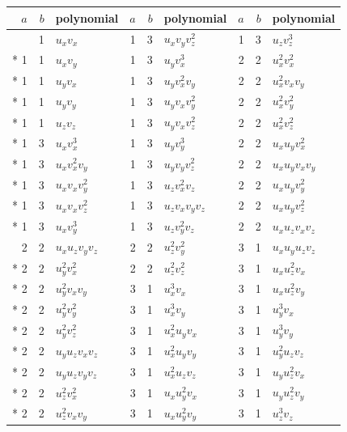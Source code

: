 \documentclass[10pt,a4paper]{article}
\makeatletter
\def\grouprule#1#2{\noalign{\marks\LTgroupmarks{\the\belowrulesep}\nobreak\vskip#1%
  \vskip\aboverulesep}\multispan\LT@cols\unskip{\leaders\hrule\@height#2\hfill\kern\z@}\cr
  \noalign{\penalty\LTrulebreak\vskip\belowrulesep\global\@lastruleclass\z@}}
\numberwithin{equation}{section}
\makeatother
\begin{document}
{\small\renewcommand{\arraystretch}{1.2}\begin{longtable}{@{}rrl@{\hspace{18pt}}rrl@{\hspace{18pt}}rrl@{}}\toprule
$a$ & $b$ & polynomial & $a$ & $b$ & polynomial & $a$ & $b$ & polynomial\\\midrule\endhead
\bottomrule\endfoot\endlastfoot
1 & 1 & $u_{x}v_{x}$ & 1 & 3 & $u_{x}v_{y}v_{z}^{2}$ & 1 & 3 & $u_{z}v_{z}^{3}$\\*
1 & 1 & $u_{x}v_{y}$ & 1 & 3 & $u_{y}v_{x}^{3}$ & 2 & 2 & $u_{x}^{2}v_{x}^{2}$\\*
1 & 1 & $u_{y}v_{x}$ & 1 & 3 & $u_{y}v_{x}^{2}v_{y}$ & 2 & 2 & $u_{x}^{2}v_{x}v_{y}$\\*
1 & 1 & $u_{y}v_{y}$ & 1 & 3 & $u_{y}v_{x}v_{y}^{2}$ & 2 & 2 & $u_{x}^{2}v_{y}^{2}$\\*
1 & 1 & $u_{z}v_{z}$ & 1 & 3 & $u_{y}v_{x}v_{z}^{2}$ & 2 & 2 & $u_{x}^{2}v_{z}^{2}$\\*
1 & 3 & $u_{x}v_{x}^{3}$ & 1 & 3 & $u_{y}v_{y}^{3}$ & 2 & 2 & $u_{x}u_{y}v_{x}^{2}$\\*
1 & 3 & $u_{x}v_{x}^{2}v_{y}$ & 1 & 3 & $u_{y}v_{y}v_{z}^{2}$ & 2 & 2 & $u_{x}u_{y}v_{x}v_{y}$\\*
1 & 3 & $u_{x}v_{x}v_{y}^{2}$ & 1 & 3 & $u_{z}v_{x}^{2}v_{z}$ & 2 & 2 & $u_{x}u_{y}v_{y}^{2}$\\*
1 & 3 & $u_{x}v_{x}v_{z}^{2}$ & 1 & 3 & $u_{z}v_{x}v_{y}v_{z}$ & 2 & 2 & $u_{x}u_{y}v_{z}^{2}$\\*
1 & 3 & $u_{x}v_{y}^{3}$ & 1 & 3 & $u_{z}v_{y}^{2}v_{z}$ & 2 & 2 & $u_{x}u_{z}v_{x}v_{z}$\\
\grouprule{0pt}{\heavyrulewidth}
2 & 2 & $u_{x}u_{z}v_{y}v_{z}$ & 2 & 2 & $u_{z}^{2}v_{y}^{2}$ & 3 & 1 & $u_{x}u_{y}u_{z}v_{z}$\\*
2 & 2 & $u_{y}^{2}v_{x}^{2}$ & 2 & 2 & $u_{z}^{2}v_{z}^{2}$ & 3 & 1 & $u_{x}u_{z}^{2}v_{x}$\\*
2 & 2 & $u_{y}^{2}v_{x}v_{y}$ & 3 & 1 & $u_{x}^{3}v_{x}$ & 3 & 1 & $u_{x}u_{z}^{2}v_{y}$\\*
2 & 2 & $u_{y}^{2}v_{y}^{2}$ & 3 & 1 & $u_{x}^{3}v_{y}$ & 3 & 1 & $u_{y}^{3}v_{x}$\\*
2 & 2 & $u_{y}^{2}v_{z}^{2}$ & 3 & 1 & $u_{x}^{2}u_{y}v_{x}$ & 3 & 1 & $u_{y}^{3}v_{y}$\\*
2 & 2 & $u_{y}u_{z}v_{x}v_{z}$ & 3 & 1 & $u_{x}^{2}u_{y}v_{y}$ & 3 & 1 & $u_{y}^{2}u_{z}v_{z}$\\*
2 & 2 & $u_{y}u_{z}v_{y}v_{z}$ & 3 & 1 & $u_{x}^{2}u_{z}v_{z}$ & 3 & 1 & $u_{y}u_{z}^{2}v_{x}$\\*
2 & 2 & $u_{z}^{2}v_{x}^{2}$ & 3 & 1 & $u_{x}u_{y}^{2}v_{x}$ & 3 & 1 & $u_{y}u_{z}^{2}v_{y}$\\*
2 & 2 & $u_{z}^{2}v_{x}v_{y}$ & 3 & 1 & $u_{x}u_{y}^{2}v_{y}$ & 3 & 1 & $u_{z}^{3}v_{z}$\\
\bottomrule\end{longtable}}
\end{document}
